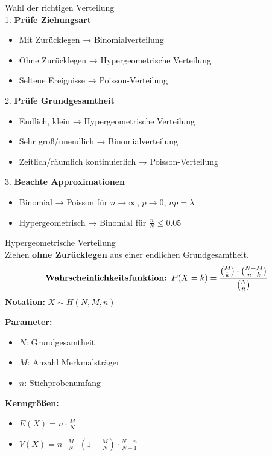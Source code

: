 \begin{KR}{Wahl der richtigen Verteilung}\\
1. \textbf{Prüfe Ziehungsart}
   \begin{itemize}
   \item Mit Zurücklegen → Binomialverteilung
   \item Ohne Zurücklegen → Hypergeometrische Verteilung
   \item Seltene Ereignisse → Poisson-Verteilung
   \end{itemize}

2. \textbf{Prüfe Grundgesamtheit}
   \begin{itemize}
   \item Endlich, klein → Hypergeometrische Verteilung
   \item Sehr groß/unendlich → Binomialverteilung
   \item Zeitlich/räumlich kontinuierlich → Poisson-Verteilung
   \end{itemize}

3. \textbf{Beachte Approximationen}
   \begin{itemize}
   \item Binomial → Poisson für $n \to \infty$, $p \to 0$, $np = \lambda$
   \item Hypergeometrisch → Binomial für $\frac{n}{N} \leq 0.05$
   \end{itemize}
\end{KR}


\begin{definition}{Hypergeometrische Verteilung}\\
Ziehen \textbf{ohne Zurücklegen} aus einer endlichen Grundgesamtheit.
$$\text{\textbf{Wahrscheinlichkeitsfunktion: }}P(X=k) = \frac{\binom{M}{k} \cdot \binom{N-M}{n-k}}{\binom{N}{n}}$$
\textbf{Notation:} $X \sim H(N,M,n)$

\begin{minipage}[t]{0.5\textwidth}
\textbf{Parameter:}
\begin{itemize}
    \item $N$: Grundgesamtheit
    \item $M$: Anzahl Merkmalsträger
    \item $n$: Stichprobenumfang
\end{itemize}
\end{minipage}
\begin{minipage}[t]{0.5\textwidth}
\textbf{Kenngrößen:}
\begin{itemize}
    \item $E(X) = n \cdot \frac{M}{N}$
    \item $V(X) = n \cdot \frac{M}{N} \cdot (1-\frac{M}{N}) \cdot \frac{N-n}{N-1}$
\end{itemize}
\end{minipage}
\end{definition}

